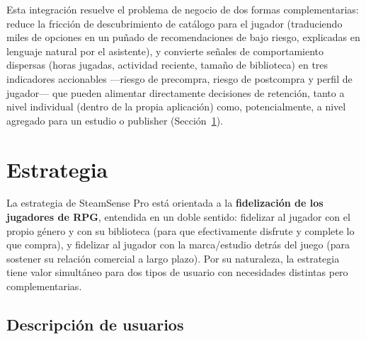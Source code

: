 \documentclass[11pt,letterpaper]{article}
\begin{document}
Esta integración resuelve el problema de negocio de dos formas complementarias: reduce la fricción de descubrimiento de catálogo para el jugador (traduciendo miles de opciones en un puñado de recomendaciones de bajo riesgo, explicadas en lenguaje natural por el asistente), y convierte señales de comportamiento dispersas (horas jugadas, actividad reciente, tamaño de biblioteca) en tres indicadores accionables ---riesgo de precompra, riesgo de postcompra y perfil de jugador--- que pueden alimentar directamente decisiones de retención, tanto a nivel individual (dentro de la propia aplicación) como, potencialmente, a nivel agregado para un estudio o publisher (Sección~\ref{sec:estrategia}).

\section{Estrategia}
\label{sec:estrategia}

La estrategia de SteamSense Pro está orientada a la \textbf{fidelización de los jugadores de RPG}, entendida en un doble sentido: fidelizar al jugador con el propio género y con su biblioteca (para que efectivamente disfrute y complete lo que compra), y fidelizar al jugador con la marca/estudio detrás del juego (para sostener su relación comercial a largo plazo). Por su naturaleza, la estrategia tiene valor simultáneo para dos tipos de usuario con necesidades distintas pero complementarias.

\subsection{Descripción de usuarios}
\end{document}
